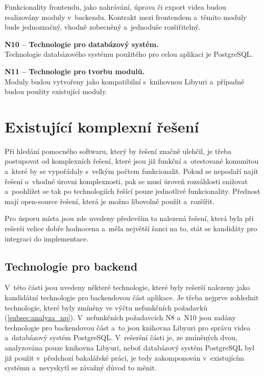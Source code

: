 \documentclass[thesis=M,czech]{FITthesis}[2012/06/26]
\begin{document}
\begin{description}
	Funkcionality frontendu, jako nahrávání, úprava či export videa budou realizovány moduly v~backendu. Kontrakt mezi frontendem a~těmito moduly bude jednoznačný, vhodně zobecněný a~jednoduše rozšiřitelný.
    \item \textbf{N10 -- Technologie pro databázový systém.\\}
	Technologie databázového systému použitého pro celou aplikaci je PostgreSQL.
    \item \textbf{N11 -- Technologie pro tvorbu modulů.\\}
	Moduly budou vytvořeny jako kompatibilní s~knihovnou Libyuri a~případně budou použity existující moduly.
  \end{description}

\section{Existující komplexní řešení} \label{sec:analyza_existujici_reseni}
Při hledání pomocného softwaru, který by řešení značně ulehčil, je třeba postupovat od komplexních řešení, které jsou již funkční a~otestované komunitou a~které by se vypořádaly s~velkým počtem funkcionalit. Pokud se nepodaří najít řešení o~vhodné úrovni komplexnosti, pak se musí úroveň rozsáhlosti snižovat a~poohlížet se tak po technologiích řešící pouze jednotlivé funkcionality. Přednost mají open-source řešení, která je možno libovolně použít a~rozšířit.

	Pro úsporu místa jsou zde uvedeny především ta nalezená řešení, která byla při rešerši velice dobře hodnocena a~měla největší šanci na to, stát se kandidáty pro integraci do implementace.

\subsection{Technologie pro backend} \label{subsec:analyza_reseni_backend}
V~této části jsou uvedeny některé technologie, které byly rešerší nalezeny jako kandidátní technologie pro backendovou část aplikace. Je třeba nejprve zohlednit technologie, které byly zmíněny ve výčtu nefunkčních požadavků (\ref{subsec:analyza_np}). V~nefunkčních požadavcích N8 a~N10 jsou zadány technologie pro backendovou část a~to jsou knihovna Libyuri pro správu videa a~databázový systém PostgreSQL. V~rešeršní části je, ze zmíněných dvou, analyzována pouze knihovna Libyuri, neboť databázový systém PostgreSQL byl již použit v~předchozí bakalářské práci, je tedy zakomponován v~existujícím systému a~nevyskytl se závažný důvod to měnit.
\end{document}
